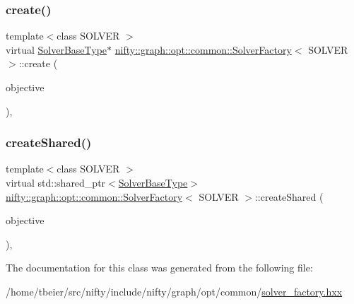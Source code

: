 \subsubsection{\texorpdfstring{create()}{create()}}
{\footnotesize\ttfamily template$<$class S\+O\+L\+V\+ER $>$ \\
virtual \hyperlink{classnifty_1_1graph_1_1opt_1_1common_1_1SolverFactory_ad87bdd3c823b312882825dbb58afdf93}{Solver\+Base\+Type}$\ast$ \hyperlink{classnifty_1_1graph_1_1opt_1_1common_1_1SolverFactory}{nifty\+::graph\+::opt\+::common\+::\+Solver\+Factory}$<$ S\+O\+L\+V\+ER $>$\+::create (\begin{DoxyParamCaption}\item[{const \hyperlink{classnifty_1_1graph_1_1opt_1_1common_1_1SolverFactory_a4ef9d5764ef3966d6610408b90446dbc}{Objective\+Type} \&}]{objective }\end{DoxyParamCaption})\hspace{0.3cm}{\ttfamily [inline]}, {\ttfamily [virtual]}}

\mbox{\label{classnifty_1_1graph_1_1opt_1_1common_1_1SolverFactory_ab49dca66d82adac8acc5b71fd218ce8f}} 
\subsubsection{\texorpdfstring{create\+Shared()}{createShared()}}
{\footnotesize\ttfamily template$<$class S\+O\+L\+V\+ER $>$ \\
virtual std\+::shared\+\_\+ptr$<$\hyperlink{classnifty_1_1graph_1_1opt_1_1common_1_1SolverFactory_ad87bdd3c823b312882825dbb58afdf93}{Solver\+Base\+Type}$>$ \hyperlink{classnifty_1_1graph_1_1opt_1_1common_1_1SolverFactory}{nifty\+::graph\+::opt\+::common\+::\+Solver\+Factory}$<$ S\+O\+L\+V\+ER $>$\+::create\+Shared (\begin{DoxyParamCaption}\item[{const \hyperlink{classnifty_1_1graph_1_1opt_1_1common_1_1SolverFactory_a4ef9d5764ef3966d6610408b90446dbc}{Objective\+Type} \&}]{objective }\end{DoxyParamCaption})\hspace{0.3cm}{\ttfamily [inline]}, {\ttfamily [virtual]}}



The documentation for this class was generated from the following file\+:\begin{DoxyCompactItemize}
\item 
/home/tbeier/src/nifty/include/nifty/graph/opt/common/\hyperlink{solver__factory_8hxx}{solver\+\_\+factory.\+hxx}\end{DoxyCompactItemize}
